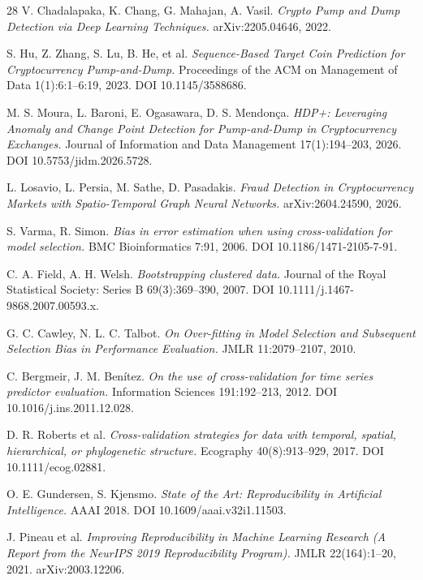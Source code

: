 \documentclass[runningheads]{llncs}
\begin{document}
\begin{thebibliography}{28}
V. Chadalapaka, K. Chang, G. Mahajan, A. Vasil. \emph{Crypto Pump and
Dump Detection via Deep Learning Techniques.} arXiv:2205.04646, 2022.

S. Hu, Z. Zhang, S. Lu, B. He, et al. \emph{Sequence-Based Target Coin
Prediction for Cryptocurrency Pump-and-Dump.} Proceedings of the ACM on
Management of Data 1(1):6:1--6:19, 2023. DOI 10.1145/3588686.

M. S. Moura, L. Baroni, E. Ogasawara, D. S. Mendon\c{c}a. \emph{HDP+:
Leveraging Anomaly and Change Point Detection for Pump-and-Dump in
Cryptocurrency Exchanges.} Journal of Information and Data Management
17(1):194--203, 2026. DOI 10.5753/jidm.2026.5728.

L. Losavio, L. Persia, M. Sathe, D. Pasadakis. \emph{Fraud Detection in
Cryptocurrency Markets with Spatio-Temporal Graph Neural Networks.}
arXiv:2604.24590, 2026.

S. Varma, R. Simon. \emph{Bias in error estimation when using
cross-validation for model selection.} BMC Bioinformatics 7:91, 2006.
DOI 10.1186/1471-2105-7-91.

C. A. Field, A. H. Welsh. \emph{Bootstrapping clustered data.} Journal
of the Royal Statistical Society: Series B 69(3):369--390, 2007. DOI
10.1111/j.1467-9868.2007.00593.x.

G. C. Cawley, N. L. C. Talbot. \emph{On Over-fitting in Model Selection
and Subsequent Selection Bias in Performance Evaluation.} JMLR
11:2079--2107, 2010.

C. Bergmeir, J. M. Ben\'itez. \emph{On the use of cross-validation for
time series predictor evaluation.} Information Sciences 191:192--213,
2012. DOI 10.1016/j.ins.2011.12.028.

D. R. Roberts et al. \emph{Cross-validation strategies for data with
temporal, spatial, hierarchical, or phylogenetic structure.} Ecography
40(8):913--929, 2017. DOI 10.1111/ecog.02881.

O. E. Gundersen, S. Kjensmo. \emph{State of the Art: Reproducibility in
Artificial Intelligence.} AAAI 2018. DOI 10.1609/aaai.v32i1.11503.

J. Pineau et al. \emph{Improving Reproducibility in Machine Learning
Research (A Report from the NeurIPS 2019 Reproducibility Program).}
JMLR 22(164):1--20, 2021. arXiv:2003.12206.


\end{thebibliography}
\end{document}
